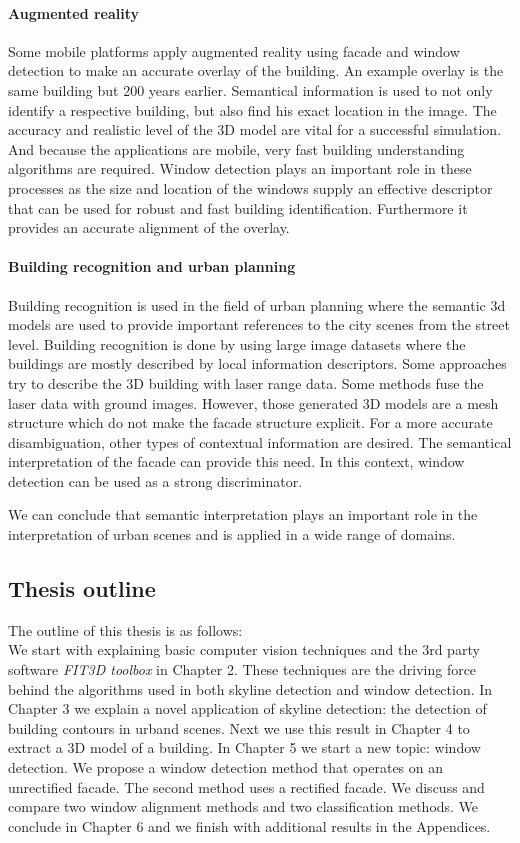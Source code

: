 \paragraph{Augmented reality}
	Some mobile platforms apply augmented reality using facade and window
	detection to make an accurate overlay of the building. An example overlay is
	the same building but 200 years earlier.  Semantical information is used to
	not only identify a respective building, but also find his exact location in
	the image.  The accuracy and realistic level of the 3D model are vital for a
	successful simulation.  And because the applications are mobile, very fast
	building understanding algorithms are required.  Window detection plays an
	important role in these processes as the size and location of the windows
	supply an effective descriptor that can be used for robust and fast building
	identification.  Furthermore it provides an accurate alignment of the
	overlay.

\paragraph{Building recognition and urban planning}
	Building recognition is used in the field of urban planning where the
	semantic 3d models are used to provide important references to the city
	scenes from the street level.  Building recognition is done by using large
	image datasets where the buildings are mostly described by local information
	descriptors.  Some approaches try to describe the 3D building with laser
	range data. Some methods fuse the laser data with ground images. However,
	those generated 3D models are a mesh structure which do not make the facade
	structure explicit.  For a more accurate disambiguation, other types of
	contextual information are desired.  The semantical interpretation of the
	facade can provide this need.  In this context, window detection can be used
	as a strong discriminator.

We can conclude that semantic interpretation plays an important role in the
interpretation of urban scenes and is applied in a wide range of domains.  

\newpage
\subsection{Thesis outline}
The outline of this thesis is as follows:\\ 

We start with explaining basic computer vision techniques and the 3rd party
software \emph{FIT3D toolbox} in Chapter 2.  These techniques are the driving
force behind the algorithms used in both skyline detection and window detection.  
In Chapter 3 we explain a novel application of skyline detection: the detection
of building contours in urband scenes. Next we use this result in Chapter 4 to
extract a 3D model of a building.
In Chapter 5 we start a new topic: window detection. We propose a window
detection method that operates on an unrectified facade. The second method uses
a rectified facade. We discuss and compare two window alignment methods and two
classification methods.  We conclude in Chapter 6 and we finish with additional
results in the Appendices.\\

